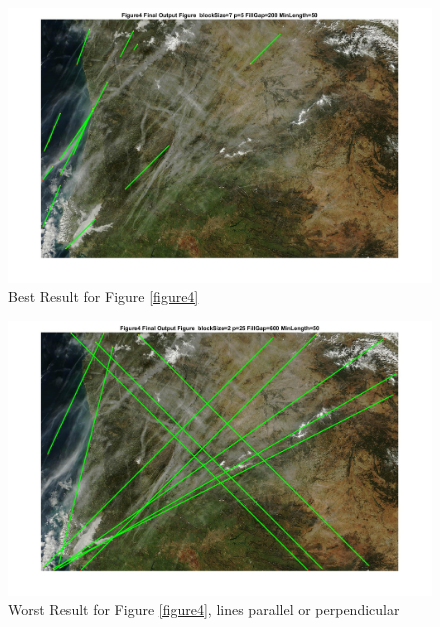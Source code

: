 \begin{figure}[hbtp]
	\centering
	\includegraphics[width=6in]{pic/Figure4_best.jpg}
	\caption{Best Result for Figure \ref{figure4}}
	\label{Figure4_best}
\end{figure}


\begin{figure}[hbtp]
	\centering
	\includegraphics[width=6in]{pic/Figure4_worst.jpg}
	\caption{Worst Result for Figure \ref{figure4}, lines parallel or perpendicular}
	\label{Figure4_worst}
\end{figure}

